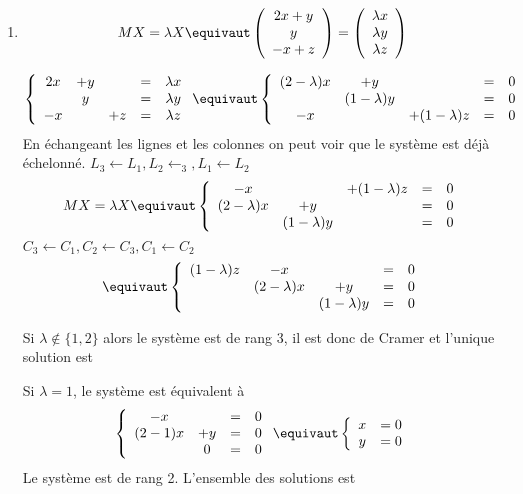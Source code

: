 \documentclass[a4paper, 11pt,reqno]{article}
\begin{document}
\begin{correction}
\begin{enumerate}
\item
$$MX=\lambda X \equivaut   \left( \begin{array}{c}
2x +y  \\
 y \\
 -x +z
\end{array}\right) = \left(
\begin{array}{c}
\lambda x\\
\lambda y\\
\lambda z
\end{array} \right)$$ 

$$\left\{ \begin{array}{ccccc}
2x &+y& & =&\lambda x \\
 &y & & =& \lambda y \\
 -x& &+z&=&\lambda z
\end{array}\right. 
\equivaut \left\{ \begin{array}{ccccc}
(2-\lambda)x &+y& & =&0 \\
 &(1-\lambda)y & & =& 0 \\
 -x& &+(1-\lambda)z&=&0
\end{array}\right. 
$$ 
 En échangeant les lignes et les colonnes on peut voir que le système est déjà échelonné.
$L_3\leftarrow L_1, L_2 \leftarrow _3, L_1\leftarrow L_2$
$$MX=\lambda X 
\equivaut  \left\{ \begin{array}{ccccc}
 -x& &+(1-\lambda)z&=&0\\
(2-\lambda)x &+y& & =&0 \\
 &(1-\lambda)y & & =& 0 
\end{array}\right.$$
$ C_3\leftarrow C_1, C_2 \leftarrow C_3, C_1\leftarrow C_2$
$$
\equivaut \left\{ \begin{array}{ccccc}
 (1-\lambda)z&-x& &=&0\\
 &(2-\lambda)x&+y & =&0 \\
 &  & (1-\lambda)y& =& 0 
\end{array}\right.$$

Si $\lambda \notin \{ 1,2\} $ alors le système est de rang 3, il est donc de Cramer et l'unique solution est 

Si $\lambda =1$, le système est équivalent à 
$$\left\{ \begin{array}{cccc}
 -x& &=&0\\
 (2-1)x&+y & =&0 \\
   & 0& =& 0 
\end{array}\right. \equivaut \left\{ \begin{array}{cc}
 x& =0\\
 y&  =0
\end{array}\right.$$
Le système est de rang 2. L'ensemble des solutions est 


\end{enumerate}
\end{correction}
\end{document}
